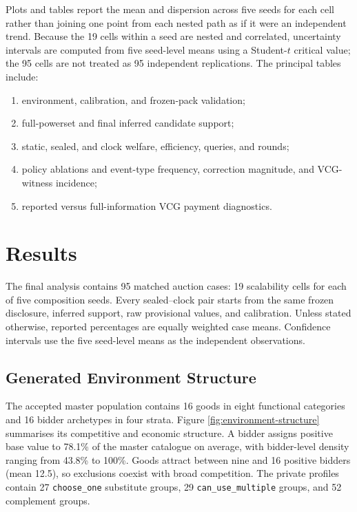 Plots and tables report the mean and dispersion across five seeds
for each cell rather than joining one point from each nested path as if it
were an independent trend. Because the 19 cells within a seed are nested and
correlated, uncertainty intervals are computed from five seed-level means
using a Student-\(t\) critical value; the 95 cells are not treated as 95
independent replications. The principal tables include:
\begin{enumerate}[leftmargin=*]
    \item environment, calibration, and frozen-pack validation;
    \item full-powerset and final inferred candidate support;
    \item static, sealed, and clock welfare, efficiency, queries, and rounds;
    \item policy ablations and event-type frequency, correction magnitude,
    and VCG-witness incidence;
    \item reported versus full-information VCG payment diagnostics.
\end{enumerate}

\section{Results}
\label{sec:results}

The final analysis contains 95 matched auction cases: 19 scalability cells
for each of five composition seeds. Every sealed--clock pair starts from the
same frozen disclosure, inferred support, raw provisional values, and
calibration. Unless stated otherwise, reported percentages are equally
weighted case means. Confidence intervals use the five seed-level means as
the independent observations.

\subsection{Generated Environment Structure}

The accepted master population contains 16 goods in eight functional
categories and 16 bidder archetypes in four strata. Figure
\ref{fig:environment-structure} summarises its competitive and economic
structure. A bidder assigns positive base value to 78.1\% of the master
catalogue on average, with bidder-level density ranging from 43.8\% to 100\%.
Goods attract between nine and 16 positive bidders (mean 12.5), so exclusions
coexist with broad competition. The private profiles contain 27
\texttt{choose\_one} substitute groups, 29
\texttt{can\_use\_multiple} groups, and 52 complement groups.

